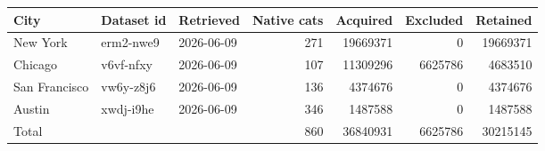 \begin{tabular}{lllrrrr}
\toprule
City & Dataset id & Retrieved & Native cats & Acquired & Excluded & Retained \\
\midrule
New York & erm2-nwe9 & 2026-06-09 & 271 & 19669371 & 0 & 19669371 \\
Chicago & v6vf-nfxy & 2026-06-09 & 107 & 11309296 & 6625786 & 4683510 \\
San Francisco & vw6y-z8j6 & 2026-06-09 & 136 & 4374676 & 0 & 4374676 \\
Austin & xwdj-i9he & 2026-06-09 & 346 & 1487588 & 0 & 1487588 \\
Total &  &  & 860 & 36840931 & 6625786 & 30215145 \\
\bottomrule
\end{tabular}
